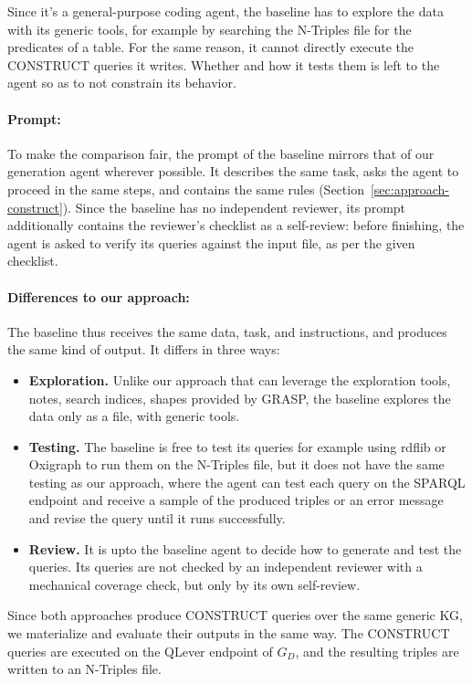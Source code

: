 Since it's a general-purpose coding agent, the baseline has to explore the data with its generic tools, for example by searching the N-Triples file for the predicates of a table. For the same reason, it cannot directly execute the CONSTRUCT queries it writes. Whether and how it tests them is left to the agent so as to not constrain its behavior.

\paragraph{Prompt:}
To make the comparison fair, the prompt of the baseline mirrors that of our generation agent wherever possible. It describes the same task, asks the agent to proceed in the same steps, and contains the same rules (Section~\ref{sec:approach-construct}). Since the baseline has no independent reviewer, its prompt additionally contains the reviewer's checklist as a self-review: before finishing, the agent is asked to verify its queries against the input file, as per the given checklist.

\paragraph{Differences to our approach:}
The baseline thus receives the same data, task, and instructions, and produces the same kind of output. It differs in three ways:
\begin{itemize}[leftmargin=*, itemsep=3pt]
  \item \textbf{Exploration.} Unlike our approach that can leverage the exploration tools, notes, search indices, shapes provided by GRASP, the baseline explores the data only as a file, with generic tools.
  \item \textbf{Testing.} The baseline is free to test its queries for example using rdflib or Oxigraph to run them on the N-Triples file, but it does not have the same testing as our approach, where the agent can test each query on the SPARQL endpoint and receive a sample of the produced triples or an error message and revise the query until it runs successfully. 
  \item \textbf{Review.} It is upto the baseline agent to decide how to generate and test the queries. Its queries are not checked by an independent reviewer with a mechanical coverage check, but only by its own self-review.
\end{itemize}
Since both approaches produce CONSTRUCT queries over the same generic KG, we materialize and evaluate their outputs in the same way. The CONSTRUCT queries are executed on the QLever endpoint of \(G_D\), and the resulting triples are written to an N-Triples file.

